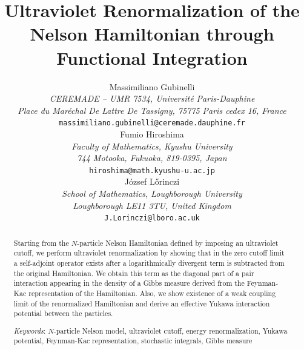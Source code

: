 \documentclass[11pt]{article}
\date{}
\providecommand{\1}{\mathbb{1}}
\begin{document}
\title
{{ Ultraviolet Renormalization of the Nelson Hamiltonian through
Functional Integration}}
\author{
\small Massimiliano Gubinelli\\[0.1cm]
 {\small\it    CEREMADE -- UMR 7534, Universit\'e Paris-Dauphine }    \\[-0.7ex]
  {\small\it  Place du Mar\'echal De Lattre De Tassigny,
75775 Paris cedex 16, France}      \\[-0.7ex]
 {\small  {\tt massimiliano.gubinelli@ceremade.dauphine.fr}   }\\[0.5cm]
\small Fumio Hiroshima\\
{\small\it Faculty of Mathematics, Kyushu University}    \\[-0.7ex]
{\small\it 744 Motooka, Fukuoka, 819-0395, Japan}      \\[-0.7ex]
{\small  {\tt hiroshima@math.kyushu-u.ac.jp}}\\[0.5cm]
\small J\'ozsef L\H{o}rinczi\\[0.1cm]
{\it \small School of Mathematics, Loughborough University} \\[-0.7ex]
{\it \small Loughborough LE11 3TU, United Kingdom} \\[-0.7ex]
{\small {\tt  J.Lorinczi@lboro.ac.uk}} \\[-0.7ex]}
\maketitle


\bigskip
\begin{abstract}
\noindent
Starting from the $N$-particle Nelson Hamiltonian defined by imposing an ultraviolet cutoff,
we perform ultraviolet %
renormalization by showing that in the zero cutoff limit a
self-adjoint operator exists after a logarithmically divergent term is subtracted from
the original Hamiltonian. We obtain this term as the diagonal part of a pair interaction
appearing in the density of a Gibbs measure derived from the Feynman-Kac representation
of the Hamiltonian. Also, we show existence of a weak coupling limit of the renormalized
Hamiltonian and derive an effective Yukawa interaction potential between the particles.

\bigskip
\noindent
\emph{Keywords}: $N$-particle Nelson model, ultraviolet cutoff, energy renormalization,
Yukawa potential, Feynman-Kac representation, stochastic integrals, Gibbs measure
\end{abstract}
\end{document}
